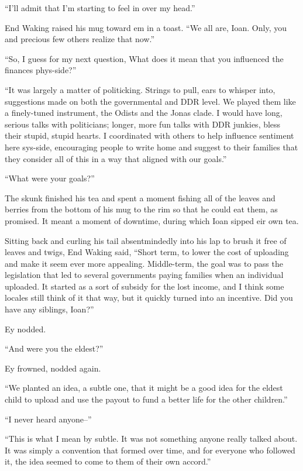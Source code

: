 ``I'll admit that I'm starting to feel in over my head.''

End Waking raised his mug toward em in a toast. ``We all are, Ioan. Only, you and precious few others realize that now.''

``So, I guess for my next question, What does it mean that you influenced the finances phys-side?''

``It was largely a matter of politicking. Strings to pull, ears to whisper into, suggestions made on both the governmental and DDR level. We played them like a finely-tuned instrument, the Odists and the Jonas clade. I would have long, serious talks with politicians; longer, more fun talks with DDR junkies, bless their stupid, stupid hearts. I coordinated with others to help influence sentiment here sys-side, encouraging people to write home and suggest to their families that they consider all of this in a way that aligned with our goals.''

``What were your goals?''

The skunk finished his tea and spent a moment fishing all of the leaves and berries from the bottom of his mug to the rim so that he could eat them, as promised. It meant a moment of downtime, during which Ioan sipped eir own tea.

Sitting back and curling his tail absentmindedly into his lap to brush it free of leaves and twigs, End Waking said, ``Short term, to lower the cost of uploading and make it seem ever more appealing. Middle-term, the goal was to pass the legislation that led to several governments paying families when an individual uploaded. It started as a sort of subsidy for the lost income, and I think some locales still think of it that way, but it quickly turned into an incentive. Did you have any siblings, Ioan?''

Ey nodded.

``And were you the eldest?''

Ey frowned, nodded again.

``We planted an idea, a subtle one, that it might be a good idea for the eldest child to upload and use the payout to fund a better life for the other children.''

``I never heard anyone--''

``This is what I mean by subtle. It was not something anyone really talked about. It was simply a convention that formed over time, and for everyone who followed it, the idea seemed to come to them of their own accord.''


